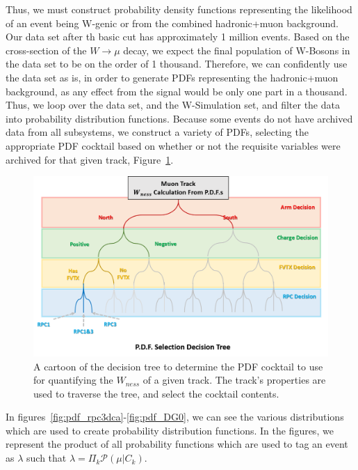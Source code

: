 Thus, we must construct probability density functions representing the
likelihood of an event being W-genic or from the combined hadronic+muon
background. Our data set after th basic cut has approximately 1 million events.
Based on the cross-section of the $W\rightarrow \mu$ decay, we expect the final
population of W-Bosons in the data set to be on the order of 1 thousand.
Therefore, we can confidently use the data set as is, in order to generate PDFs
representing the hadronic+muon background, as any effect from the signal would
be only one part in a thousand. Thus, we loop over the data set, and the
W-Simulation set, and filter the data into probability distribution functions.
Because some events do not have archived data from all subsystems, we construct
a variety of PDFs, selecting the appropriate PDF cocktail based on whether or
not the requisite variables were archived for that given track,
Figure~\ref{fig:pdf_selection_tree}.

\begin{figure}[ht]
  \centering
  \includegraphics[width=\linewidth,trim=4 4 4 4,clip]{./figures/pdf_selection_tree.png}
  \caption{
    A cartoon of the decision tree to determine the PDF cocktail to use for
    quantifying the $W_{ness}$ of a given track. The track's properties are used
    to traverse the tree, and select the cocktail contents.
  }
  \label{fig:pdf_selection_tree}
\end{figure}

In figures~\ref{fig:pdf_rpc3dca}-\ref{fig:pdf_DG0}, we can see the various
distributions which are used to create probability distribution functions. In
the figures, we represent the product of all probability functions which are
used to tag an event as $\lambda$ such that 
$\lambda = \Pi_{k} \mathcal{P}(\mu \vert C_k)$.

